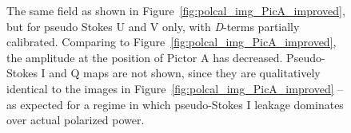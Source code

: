 \begin{figure}
\caption[The same field as shown in Figure~\ref{fig:polcal_img_PicA_improved}, but for pseudo Stokes U and V only, with \textit{D}-terms partially calibrated.]{The same field as shown in Figure~\ref{fig:polcal_img_PicA_improved}, but for pseudo Stokes U and V only, with \textit{D}-terms partially calibrated. Comparing to Figure~\ref{fig:polcal_img_PicA_improved}, the amplitude at the position of Pictor A has decreased. Pseudo-Stokes I and Q maps are not shown, since they are qualitatively identical to the images in Figure~\ref{fig:polcal_img_PicA_improved} -- as expected for a regime in which pseudo-Stokes I leakage dominates over actual polarized power.}
\label{fig:polcal_img_PicA_improved_dterm}
\end{figure}



